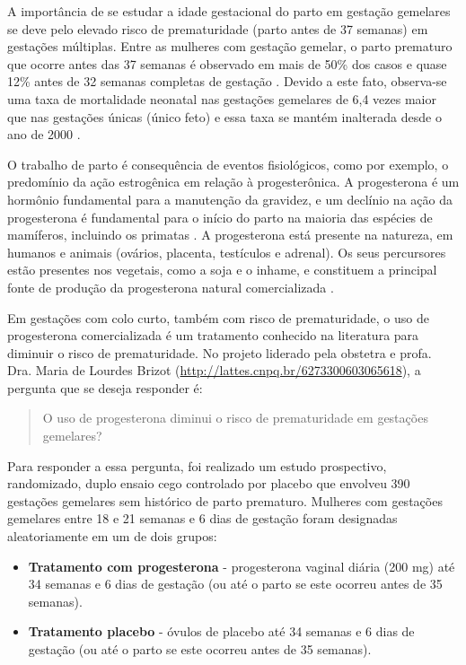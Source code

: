 \documentclass[
]{book}
\begin{document}
A importância de se estudar a idade gestacional do parto em gestação gemelares se deve pelo elevado risco de prematuridade (parto antes de 37 semanas) em gestações múltiplas. Entre as mulheres com gestação gemelar, o parto prematuro que ocorre antes das 37 semanas é observado em mais de 50\% dos casos e quase 12\% antes de 32 semanas completas de gestação \citep{silva1995prematuridade}. Devido a este fato, observa-se uma taxa de mortalidade neonatal nas gestações gemelares de 6,4 vezes maior que nas gestações únicas (único feto) e essa taxa se mantém inalterada desde o ano de 2000 \citep{into2009child}.

O trabalho de parto é consequência de eventos fisiológicos, como por exemplo, o predomínio da ação estrogênica em relação à progesterônica. A progesterona é um hormônio fundamental para a manutenção da gravidez, e um declínio na ação da progesterona é fundamental para o início do parto na maioria das espécies de mamíferos, incluindo os primatas \citep{astle2003involvement}. A progesterona está presente na natureza, em humanos e animais (ovários, placenta, testículos e adrenal). Os seus percursores estão presentes nos vegetais, como a soja e o inhame, e constituem a principal fonte de produção da progesterona natural comercializada \citep{de2016prenatal}.

Em gestações com colo curto, também com risco de prematuridade, o uso de progesterona comercializada é um tratamento conhecido na literatura para diminuir o risco de prematuridade. No projeto liderado pela obstetra e profa. Dra. Maria de Lourdes Brizot (\url{http://lattes.cnpq.br/6273300603065618}), a pergunta que se deseja responder é:

\begin{quote}
O uso de progesterona diminui o risco de prematuridade em gestações gemelares?
\end{quote}

Para responder a essa pergunta, foi realizado um estudo prospectivo, randomizado, duplo
ensaio cego controlado por placebo que envolveu 390
gestações gemelares sem histórico de parto prematuro. Mulheres com gestações gemelares entre 18 e 21 semanas e 6 dias de gestação foram designadas aleatoriamente em um de dois grupos:

\begin{itemize}
\item
  \textbf{Tratamento com progesterona} - progesterona vaginal diária (200 mg) até 34 semanas e 6 dias de gestação (ou até o parto se este ocorreu antes de 35 semanas).
\item
  \textbf{Tratamento placebo} - óvulos de placebo até 34 semanas e 6 dias de gestação (ou até o parto se este ocorreu antes de 35 semanas).
\end{itemize}
\end{document}
